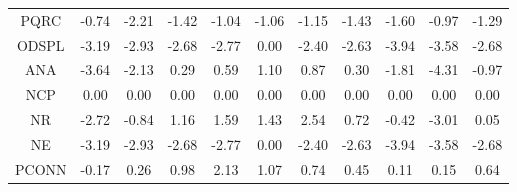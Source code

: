 \documentclass[11pt,a4paper]{report}
\begin{document}
\begin{longtable}{ | c || c | c | c | c | c | c | c | c | c || c |}
PQRC &  \cellcolor[HTML]{FFEFEF} -0.74 &  \cellcolor[HTML]{FFC7C7} -2.21 &  \cellcolor[HTML]{FFDFDF} -1.42 &  \cellcolor[HTML]{FFE7E7} -1.04 &  \cellcolor[HTML]{FFE7E7} -1.06 &  \cellcolor[HTML]{FFDFDF} -1.15 &  \cellcolor[HTML]{FFD7D7} -1.43 &  \cellcolor[HTML]{FFD7D7} -1.60 &  \cellcolor[HTML]{FFE7E7} -0.97 &  \cellcolor[HTML]{FFDFDF} -1.29 \\
ODSPL &  \cellcolor[HTML]{FFAFAF} -3.19 &  \cellcolor[HTML]{FFB7B7} -2.93 &  \cellcolor[HTML]{FFBFBF} -2.68 &  \cellcolor[HTML]{FFB7B7} -2.77 &  \cellcolor[HTML]{FFFFFF} 0.00 &  \cellcolor[HTML]{FFBFBF} -2.40 &  \cellcolor[HTML]{FFBFBF} -2.63 &  \cellcolor[HTML]{FF9F9F} -3.94 &  \cellcolor[HTML]{FFA7A7} -3.58 &  \cellcolor[HTML]{FFBFBF} -2.68 \\
ANA &  \cellcolor[HTML]{FFA7A7} -3.64 &  \cellcolor[HTML]{FFC7C7} -2.13 &  \cellcolor[HTML]{F7F7FF} 0.29 &  \cellcolor[HTML]{EFEFFF} 0.59 &  \cellcolor[HTML]{E7E7FF} 1.10 &  \cellcolor[HTML]{E7E7FF} 0.87 &  \cellcolor[HTML]{F7F7FF} 0.30 &  \cellcolor[HTML]{FFCFCF} -1.81 &  \cellcolor[HTML]{FF8F8F} -4.31 &  \cellcolor[HTML]{FFE7E7} -0.97 \\
NCP &  \cellcolor[HTML]{FFFFFF} 0.00 &  \cellcolor[HTML]{FFFFFF} 0.00 &  \cellcolor[HTML]{FFFFFF} 0.00 &  \cellcolor[HTML]{FFFFFF} 0.00 &  \cellcolor[HTML]{FFFFFF} 0.00 &  \cellcolor[HTML]{FFFFFF} 0.00 &  \cellcolor[HTML]{FFFFFF} 0.00 &  \cellcolor[HTML]{FFFFFF} 0.00 &  \cellcolor[HTML]{FFFFFF} 0.00 &  \cellcolor[HTML]{FFFFFF} 0.00 \\
NR &  \cellcolor[HTML]{FFB7B7} -2.72 &  \cellcolor[HTML]{FFE7E7} -0.84 &  \cellcolor[HTML]{DFDFFF} 1.16 &  \cellcolor[HTML]{D7D7FF} 1.59 &  \cellcolor[HTML]{D7D7FF} 1.43 &  \cellcolor[HTML]{BFBFFF} 2.54 &  \cellcolor[HTML]{EFEFFF} 0.72 &  \cellcolor[HTML]{FFF7F7} -0.42 &  \cellcolor[HTML]{FFB7B7} -3.01 &  \cellcolor[HTML]{FFFFFF} 0.05 \\
NE &  \cellcolor[HTML]{FFAFAF} -3.19 &  \cellcolor[HTML]{FFB7B7} -2.93 &  \cellcolor[HTML]{FFBFBF} -2.68 &  \cellcolor[HTML]{FFB7B7} -2.77 &  \cellcolor[HTML]{FFFFFF} 0.00 &  \cellcolor[HTML]{FFBFBF} -2.40 &  \cellcolor[HTML]{FFBFBF} -2.63 &  \cellcolor[HTML]{FF9F9F} -3.94 &  \cellcolor[HTML]{FFA7A7} -3.58 &  \cellcolor[HTML]{FFBFBF} -2.68 \\
PCONN &  \cellcolor[HTML]{FFF7F7} -0.17 &  \cellcolor[HTML]{F7F7FF} 0.26 &  \cellcolor[HTML]{E7E7FF} 0.98 &  \cellcolor[HTML]{C7C7FF} 2.13 &  \cellcolor[HTML]{E7E7FF} 1.07 &  \cellcolor[HTML]{EFEFFF} 0.74 &  \cellcolor[HTML]{F7F7FF} 0.45 &  \cellcolor[HTML]{FFFFFF} 0.11 &  \cellcolor[HTML]{FFFFFF} 0.15 &  \cellcolor[HTML]{EFEFFF} 0.64 \\

\end{longtable}
\end{document}

